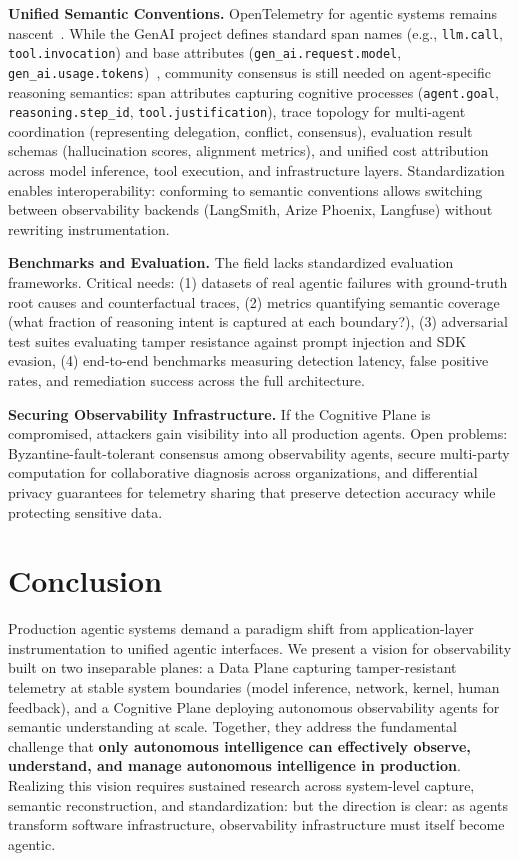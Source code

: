 \documentclass[sigplan,screen,9pt]{acmart}
\begin{document}
\textbf{Unified Semantic Conventions.} OpenTelemetry for agentic systems remains nascent~\cite{otelgenai,semconv}. While the GenAI project defines standard span names (e.g., \texttt{llm.call}, \texttt{tool.invocation}) and base attributes (\texttt{gen\_ai.request.model}, \texttt{gen\_ai.usage.tokens})~\cite{otelgenai}, community consensus is still needed on agent-specific reasoning semantics: span attributes capturing cognitive processes (\texttt{agent.goal}, \texttt{reasoning.step\_id}, \texttt{tool.justification}), trace topology for multi-agent coordination (representing delegation, conflict, consensus), evaluation result schemas (hallucination scores, alignment metrics), and unified cost attribution across model inference, tool execution, and infrastructure layers. Standardization enables interoperability: conforming to semantic conventions allows switching between observability backends (LangSmith, Arize Phoenix, Langfuse) without rewriting instrumentation.

\textbf{Benchmarks and Evaluation.} The field lacks standardized evaluation frameworks. Critical needs: (1) datasets of real agentic failures with ground-truth root causes and counterfactual traces, (2) metrics quantifying semantic coverage (what fraction of reasoning intent is captured at each boundary?), (3) adversarial test suites evaluating tamper resistance against prompt injection and SDK evasion, (4) end-to-end benchmarks measuring detection latency, false positive rates, and remediation success across the full architecture.

\textbf{Securing Observability Infrastructure.} If the Cognitive Plane is compromised, attackers gain visibility into all production agents. Open problems: Byzantine-fault-tolerant consensus among observability agents, secure multi-party computation for collaborative diagnosis across organizations, and differential privacy guarantees for telemetry sharing that preserve detection accuracy while protecting sensitive data.

\section{Conclusion}

Production agentic systems demand a paradigm shift from application-layer instrumentation to unified agentic interfaces. We present a vision for observability built on two inseparable planes: a Data Plane capturing tamper-resistant telemetry at stable system boundaries (model inference, network, kernel, human feedback), and a Cognitive Plane deploying autonomous observability agents for semantic understanding at scale. Together, they address the fundamental challenge that \textbf{only autonomous intelligence can effectively observe, understand, and manage autonomous intelligence in production}. Realizing this vision requires sustained research across system-level capture, semantic reconstruction, and standardization: but the direction is clear: as agents transform software infrastructure, observability infrastructure must itself become agentic.



\end{document}
